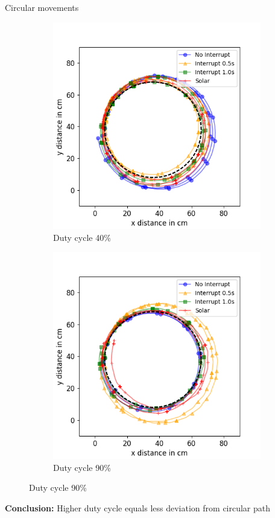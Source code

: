 \documentclass{beamer}
\begin{document}
\begin{frame}{Circular movements}
	\begin{figure}[h!]
		\centering
		\begin{subfigure}[b]{0.49\textwidth}
			\includegraphics[width=\textwidth]{pics/circle_40.png}
			\caption*{Duty cycle 40\%}
		\end{subfigure}
		\begin{subfigure}[b]{0.49\textwidth}
			\includegraphics[width=\textwidth]{pics/circle_90.png}
			\caption*{Duty cycle 90\%}
		\end{subfigure}
	\end{figure}
	\pause
	\textbf{Conclusion:} Higher duty cycle equals less deviation from circular path
\end{frame}
\end{document}
